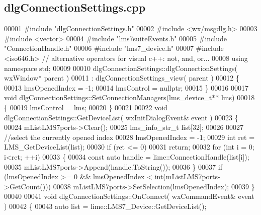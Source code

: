 \subsection{dlg\+Connection\+Settings.\+cpp}
\label{dlgConnectionSettings_8cpp_source}

\begin{DoxyCode}
00001 \textcolor{preprocessor}{#include "dlgConnectionSettings.h"}
00002 \textcolor{preprocessor}{#include <wx/msgdlg.h>}
00003 \textcolor{preprocessor}{#include <vector>}
00004 \textcolor{preprocessor}{#include "lms7suiteEvents.h"}
00005 \textcolor{preprocessor}{#include "ConnectionHandle.h"}
00006 \textcolor{preprocessor}{#include "lms7_device.h"}
00007 \textcolor{preprocessor}{#include <iso646.h>} \textcolor{comment}{// alternative operators for visual c++: not, and, or...}
00008 \textcolor{keyword}{using namespace }std;
00009 
00010 dlgConnectionSettings::dlgConnectionSettings( wxWindow* parent )
00011     : dlgConnectionSettings_view( parent )
00012 \{
00013     lmsOpenedIndex = -1;
00014     lmsControl = \textcolor{keyword}{nullptr};
00015 \}
00016 
00017 \textcolor{keywordtype}{void} dlgConnectionSettings::SetConnectionManagers(lms_device_t** lms)
00018 \{
00019     lmsControl = lms;
00020 \}
00021 
00022 \textcolor{keywordtype}{void} dlgConnectionSettings::GetDeviceList( wxInitDialogEvent& event )
00023 \{
00024     mListLMS7ports->Clear();
00025     lms_info_str_t list[32];
00026 
00027     \textcolor{comment}{//select the currently opened index}
00028     lmsOpenedIndex = -1;
00029     \textcolor{keywordtype}{int} ret = LMS_GetDeviceList(list);
00030     \textcolor{keywordflow}{if} (ret <= 0)
00031         \textcolor{keywordflow}{return};
00032     \textcolor{keywordflow}{for} (\textcolor{keywordtype}{int} i = 0; i<ret; ++i)
00033     \{
00034         \textcolor{keyword}{const} \textcolor{keyword}{auto} handle = lime::ConnectionHandle(list[i]);
00035         mListLMS7ports->Append(handle.ToString());
00036     \}
00037     \textcolor{keywordflow}{if} (lmsOpenedIndex >= 0 && lmsOpenedIndex < \textcolor{keywordtype}{int}(mListLMS7ports->GetCount()))
00038         mListLMS7ports->SetSelection(lmsOpenedIndex);
00039 \}
00040 
00041 \textcolor{keywordtype}{void} dlgConnectionSettings::OnConnect( wxCommandEvent& event )
00042 \{
00043     \textcolor{keyword}{auto} list = lime::LMS7_Device::GetDeviceList();

\end{DoxyCode}
